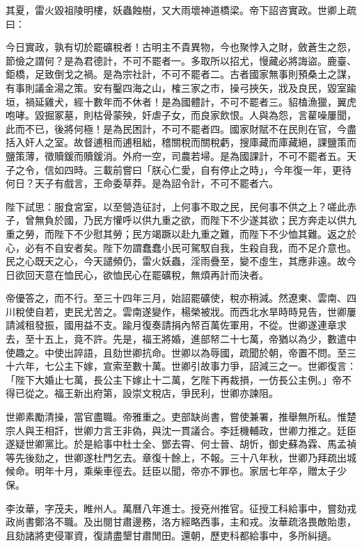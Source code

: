 \begin{pinyinscope}
其夏，雷火毀祖陵明樓，妖蟲蝕樹，又大雨壞神道橋梁。帝下詔咨實政。世卿上疏曰：

今日實政，孰有切於罷礦稅者！古明主不貴異物，今也聚悖入之財，斂蒼生之怨，節儉之謂何？是為君德計，不可不罷者一。多取所以招尤，慢藏必將誨盜。鹿臺、鉅橋，足致倒戈之禍。是為宗社計，不可不罷者二。古者國家無事則預桑土之謀，有事則議金湯之策。安有鑿四海之山，榷三家之市，操弓挾矢，戕及良民，毀室踰垣，禍延雞犬，經十數年而不休者！是為國體計，不可不罷者三。貂榼漁獵，翼虎咆哮。毀掘冢墓，則枯骨蒙殃，奸虐子女，而良家飲恨。人與為怨，言雚噪屢聞，此而不已，後將何極！是為民困計，不可不罷者四。國家財賦不在民則在官，今盡括入奸人之室。故督逋租而逋租絀，稽關稅而關稅虧，搜庫藏而庫藏絕，課鹽策而鹽策薄，徵贖鍰而贖鍰消。外府一空，司農若埽。是為國課計，不可不罷者五。天子之令，信如四時。三載前嘗曰「朕心仁愛，自有停止之時」，今年復一年，更待何日？天子有戲言，王命委草莽。是為詔令計，不可不罷者六。

陛下試思：服食宮室，以至營造征討，上何事不取之民，民何事不供之上？嗟此赤子，曾無負於國，乃民方懽呼以供九重之欲，而陛下不少遂其欲；民方奔走以供九重之勞，而陛下不少慰其勞；民方竭蹶以赴九重之難，而陛下不少恤其難。返之於心，必有不自安者矣。陛下勿謂蠢蠢小民可駕馭自我，生殺自我，而不足介意也。民之心既天之心，今天譴頻仍，雷火妖蟲，淫雨疊至，變不虛生，其應非遠。故今日欲回天意在恤民心，欲恤民心在罷礦稅，無煩再計而決者。

帝優答之，而不行。至三十四年三月，始詔罷礦使，稅亦稍減。然遼東、雲南、四川稅使自若，吏民尤苦之。雲南遂變作，楊榮被戕。而西北水旱時時見告，世卿屢請減租發振，國用益不支。踰月復奏請捐內帑百萬佐軍用，不從。世卿遂連章求去，至十五上，竟不許。先是，福王將婚，進部帑二十七萬，帝猶以為少，數遣中使趣之。中使出誶語，且劾世卿抗命。世卿以為辱國，疏聞於朝，帝置不問。至三十六年，七公主下嫁，宣索至數十萬。世卿引故事力爭，詔減三之一。世卿復言：「陛下大婚止七萬，長公主下嫁止十二萬，乞陛下再裁損，一仿長公主例。」帝不得已從之。福王新出府第，設崇文稅店，爭民利，世卿亦諫阻。

世卿素勵清操，當官盡職。帝雅重之。吏部缺尚書，嘗使兼署，推舉無所私。惟楚宗人與王相訐，世卿力言王非偽，與沈一貫議合。李廷機輔政，世卿力推之。廷臣遂疑世卿黨比。於是給事中杜士全、鄧去霄、何士晉、胡忻，御史蘇為霖、馬孟禎等先後劾之，世卿遂杜門乞去。章復十餘上，不報。三十八年秋，世卿乃拜疏出城候命。明年十月，乘柴車徑去。廷臣以聞，帝亦不罪也。家居七年卒，贈太子少保。

李汝華，字茂夫，睢州人。萬曆八年進士。授兗州推官。征授工科給事中，嘗劾戎政尚書鄭洛不職。及出閱甘肅邊務，洛方經略西事，主和戎。汝華疏洛畏敵貽患，且劾諸將吏侵軍資，復請盡墾甘肅閒田。還朝，歷吏科都給事中，多所糾擿。


\end{pinyinscope}

